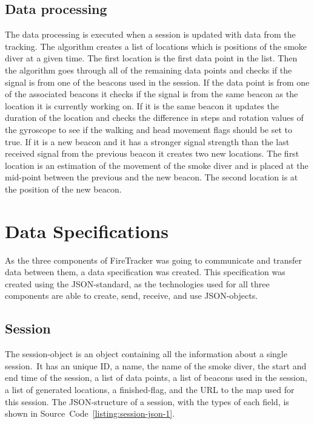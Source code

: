 \documentclass[../Main/thesis.tex]{subfiles}
\begin{document}
\subsection{Data processing}
The data processing is executed when a session is updated with data from the tracking.
The algorithm creates a list of locations which is positions of the smoke diver at a given time.
The first location is the first data point in the list.
Then the algorithm goes through all of the remaining data points and checks if the signal is from one of the beacons used in the session. 
If the data point is from one of the associated beacons it checks if the signal is from the same beacon as the location it is currently working on.
If it is the same beacon it updates the duration of the location and checks the difference in steps and rotation values of the gyroscope to see if the walking and head movement flags should be set to true.
If it is a new beacon and it has a stronger signal strength than the last received signal from the previous beacon it creates two new locations.
The first location is an estimation of the movement of the smoke diver and is placed at the mid-point between the previous and the new beacon.
The second location is at the position of the new beacon.

\section{Data Specifications}
\label{sec:data-specifications-1}
As the three components of FireTracker was going to communicate and transfer data between them, a data specification was created.
This specification was created using the JSON-standard, as the technologies used for all three components are able to create, send, receive, and use JSON-objects.

\subsection{Session}
The session-object is an object containing all the information about a single session.\
It has an unique ID, a name, the name of the smoke diver, the start and end time of the session, a list of data points, a list of beacons used in the session, a list of generated locations, a finished-flag, and the URL to the map used for this session. 
The JSON-structure of a session, with the types of each field, is shown in Source~Code~\ref{listing:session-json-1}.

\end{document}
